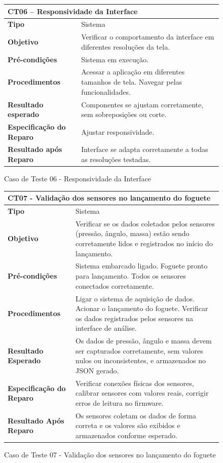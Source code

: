\begin{figure}[H]
    \centering
\begin{longtable}{|p{}|p{}|}
\hline
\multicolumn{2}{|l|}{\textbf{CT06 – Responsividade da Interface}} \\
\hline
\textbf{Tipo} & Sistema \\
\hline
\textbf{Objetivo} & Verificar o comportamento da interface em diferentes resoluções da tela. \\
\hline
\textbf{Pré-condições} & Sistema em execução. \\
\hline
\textbf{Procedimentos} & Acessar a aplicação em diferentes tamanhos de tela. Navegar pelas funcionalidades. \\
\hline
\textbf{Resultado esperado} & Componentes se ajustam corretamente, sem sobreposições ou corte. \\
\hline
\textbf{Especificação do Reparo} & Ajustar responsividade. \\
\hline
\textbf{Resultado após Reparo} & Interface se adapta corretamente a todas as resoluções testadas. \\
\hline
\end{longtable}
\caption{Caso de Teste 06 - Responsividade da Interface}
\label{fig_ct06_responsividade_interface}
\end{figure}

\begin{figure}[H]
    \centering
\begin{longtable}{|p{}|p{}|}
\hline
\multicolumn{2}{|l|}{\textbf{CT07 - Validação dos sensores no lançamento do foguete}} \\
\hline
\textbf{Tipo} & Sistema \\
\hline
\textbf{Objetivo} & Verificar se os dados coletados pelos sensores (pressão, ângulo, massa) estão sendo corretamente lidos e registrados no início do lançamento. \\
\hline
\textbf{Pré-condições} & Sistema embarcado ligado.  Foguete pronto para lançamento.  Todos os sensores conectados corretamente. \\
\hline
\textbf{Procedimentos} & Ligar o sistema de aquisição de dados.  Acionar o lançamento do foguete.  Verificar os dados registrados pelos sensores na interface de análise. \\
\hline
\textbf{Resultado Esperado} & Os dados de pressão, ângulo e massa devem ser capturados corretamente, sem valores nulos ou inconsistentes, e armazenados no JSON gerado. \\
\hline
\textbf{Especificação do Reparo} & Verificar conexões físicas dos sensores, calibrar sensores com valores reais, corrigir erros de leitura no firmware. \\
\hline
\textbf{Resultado Após Reparo} & Os sensores coletam os dados de forma correta e os valores são exibidos e armazenados conforme esperado. \\
\hline
\end{longtable}
\caption{Caso de Teste 07 - Validação dos sensores no lançamento do foguete}
\label{fig_ct07_validacao_sensores_lancamento_foguete}
\end{figure}

